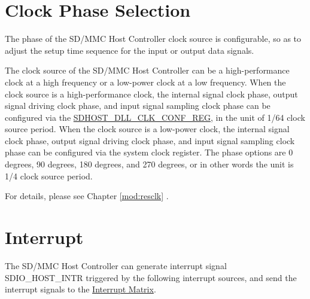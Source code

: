 \documentclass[main\_\_EN.tex]{subfiles}
\begin{document}
\section{Clock Phase Selection}\label{sec:sdhost-phase-selection}

The phase of the SD/MMC Host Controller clock source is configurable, so as to adjust the setup time sequence for the input or output data signals.

The clock source of the SD/MMC Host Controller can be a high-performance clock at a high frequency or a low-power clock at a low frequency. When the clock source is a high-performance clock, the internal signal clock phase, output signal driving clock phase, and input signal sampling clock phase can be configured via the \hyperref[regdesc:SDHOSTDLLCLKCONFREG]{SDHOST\_DLL\_CLK\_CONF\_REG}, in the unit of 1/64 clock source period. When the clock source is a low-power clock, the internal signal clock phase, output signal driving clock phase, and input signal sampling clock phase can be configured via the system clock register. The phase options are 0 degrees, 90 degrees, 180 degrees, and 270 degrees, or in other words the unit is 1/4 clock source period.

For details, please see Chapter \ref{mod:resclk} \textit{}.


\section{Interrupt}

The SD/MMC Host Controller can generate interrupt signal SDIO\_HOST\_INTR triggered by the following interrupt sources, and send the interrupt signals to the \hyperref[mod:intmtrx]{Interrupt Matrix}.
\end{document}
